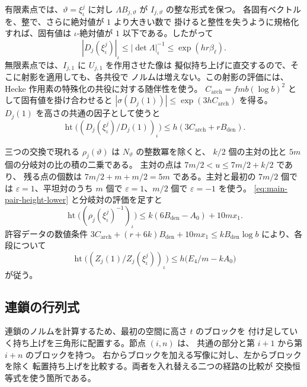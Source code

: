 有限素点では、\(\vartheta=\xi_\iota^j\) に対し
\(\Lambda B_{j,\vartheta}\) が \(I_{j,\vartheta}\) の整な形式を保つ。
各固有ベクトルを、整で、さらに絶対値が \(1\) より大きい数で
掛けると整性を失うように規格化すれば、固有値は
\(\iota\)-絶対値が \(1\) 以下である。したがって
\[
 |D_j(\xi_\iota^j)|_\iota
   \le|\det\Lambda|_\iota^{-1}
   \le\exp(hr\beta_\ell).
\]
無限素点では、\(I_{j,1}\) に \(U_{j,1}\) を作用させた像は
擬似持ち上げに直交するので、そこに射影を適用しても、各共役で
ノルムは増えない。この射影の評価には、
Hecke 作用素の特殊化の共役に対する随伴性を使う。
\(C_{\mathrm{arch}}=fmb(\log b)^2\) として固有値を掛け合わせると
\(|\sigma(D_j(1))|\le\exp(3h C_{\mathrm{arch}})\) を得る。
\(D_j(1)\) を高さの共通の因子として使うと
\[
 \operatorname{ht}\bigl((D_j(\xi_\iota^j)/D_j(1))_\iota\bigr)
     \le h(3C_{\mathrm{arch}}+r B_{\mathrm{den}}).
\]

三つの交換で現れる \(\rho_j(\vartheta)\) は \(N_\vartheta\) の整数冪を除くと、
\(k/2\) 個の主対の比と \(5m\) 個の分岐対の比の積の二乗である。
主対の点は \(7m/2<u\le 7m/2+k/2\) であり、
残る点の個数は \(7m/2+m+m/2=5m\) である。主対と最初の \(7m/2\) 個では
\(\varepsilon=1\)、平坦対のうち \(m\) 個で \(\varepsilon=1\)、\(m/2\) 個で \(\varepsilon=-1\) を使う。
\eqref{eq:main-pair-height-lower} と分岐対の評価を足すと
\[
 \operatorname{ht}\bigl((\rho_j(\xi_\iota^j)^{-1})_\iota\bigr)
  \le k(6B_{\mathrm{den}}-A_0)+10mx_1 .
\]
許容データの数値条件
\(3C_{\mathrm{arch}}+(r+6k)B_{\mathrm{den}}+10mx_1
        \le k B_{\mathrm{den}}\log b\)
により、各段について
\begin{equation}
 \operatorname{ht}\bigl((Z_j(1)/Z_j(\xi_\iota^j))_\iota\bigr)
   \le h\big(E_4/m-k A_0\big)
 \label{eq:single-relative-height}
\end{equation}
が従う。

\subsection{連鎖の行列式}

連鎖のノルムを計算するため、最初の空間に高さ \(t\) のブロックを
付け足していく持ち上げを三角形に配置する。節点 \((i,n)\) は、
共通の部分と第 \(i+1\) から第 \(i+n\) のブロックを持つ。
右からブロックを加える写像に対し、左からブロックを除く
転置持ち上げを比較する。両者を入れ替える二つの経路の比較が
交換恒等式を使う箇所である。


